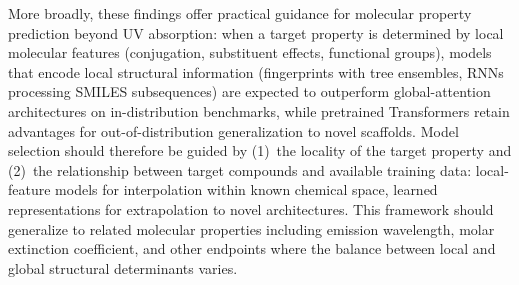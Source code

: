 More broadly, these findings offer practical guidance for molecular property prediction beyond UV absorption: when a target property is determined by local molecular features (conjugation, substituent effects, functional groups), models that encode local structural information (fingerprints with tree ensembles, RNNs processing SMILES subsequences) are expected to outperform global-attention architectures on in-distribution benchmarks, while pretrained Transformers retain advantages for out-of-distribution generalization to novel scaffolds.
Model selection should therefore be guided by (1)~the locality of the target property and (2)~the relationship between target compounds and available training data: local-feature models for interpolation within known chemical space, learned representations for extrapolation to novel architectures.
This framework should generalize to related molecular properties including emission wavelength, molar extinction coefficient, and other endpoints where the balance between local and global structural determinants varies.

